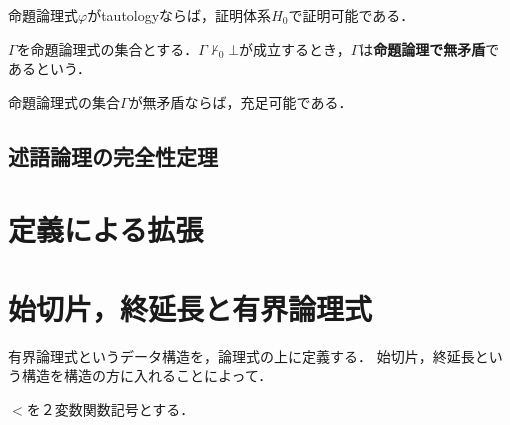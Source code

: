 \documentclass[uplatex, 12pt, dvipdfmx]{jsreport}
\begin{document}
\begin{theorem}
    命題論理式$\varphi$がtautologyならば，証明体系$H_0$で証明可能である．
\end{theorem}

\begin{definition}[consistent]
    $\Gamma$を命題論理式の集合とする．$\Gamma\nvdash_0\bot$が成立するとき，$\Gamma$は\textbf{命題論理で無矛盾}であるという．
\end{definition}

\begin{corollary}
    命題論理式の集合$\Gamma$が無矛盾ならば，充足可能である．
\end{corollary}

\subsection{述語論理の完全性定理}

\section{定義による拡張}\label{section-保存拡大}

\section{始切片，終延長と有界論理式}

有界論理式というデータ構造を，論理式の上に定義する．
始切片，終延長という構造を構造の方に入れることによって．

\begin{notation}
    $<$を２変数関数記号とする．
\end{notation}
\end{document}
